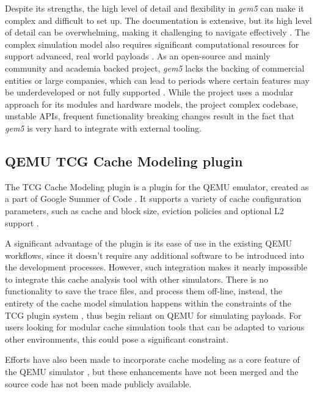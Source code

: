 Despite its strengths, the high level of detail and flexibility in \textit{gem5}
can make it complex and difficult to set up. The documentation is extensive, but its high level of detail can be overwhelming,
making it challenging to navigate effectively \cite{gem5hell}. The complex simulation model also requires significant computational resources for support advanced, real world payloads
\cite{gem5, cachesimsurv}. As an open-source and mainly community and academia backed project, \textit{gem5} lacks the backing of commercial entities or large companies, which can lead to
periods where certain features may be underdeveloped or not fully supported \cite{gem5hell, gem5maintainers}.
While the project uses a modular approach for its modules and hardware models, the project complex codebase,
unstable APIs, frequent functionality breaking changes \cite{gem5hell} result in the fact that \textit{gem5} is very hard to integrate with external tooling.

\subsection{QEMU TCG Cache Modeling plugin} \label{sec:qemu_cache}

The TCG Cache Modeling plugin is a plugin for the QEMU emulator, created as a part of Google Summer of Code \cite{qemucachegsoc}. It supports a variety of cache configuration parameters, such as
cache and block size, eviction policies and optional L2 support \cite{tcgcachemodelling}.

A significant advantage of the plugin is its ease of use in the existing QEMU workflows, since it doesn't require any additional software to be introduced into the development processes.
However, such integration makes it nearly impossible to integrate this cache analysis tool with other simulators. There is no functionality to save the trace files, and process them off-line,
instead, the entirety of the cache model simulation happens within the constraints of the TCG plugin system \cite{qemutcgplugindocs}, thus begin reliant on QEMU for simulating 
payloads. For users looking for modular cache simulation tools that can be adapted to various other environments, this could pose a significant constraint.

\vspace{10px}
\noindent Efforts have also been made to incorporate cache modeling as a core feature of the QEMU simulator \cite{qemucacheattempt}, but these enhancements have not been merged and the
source code has not been made publicly available.

